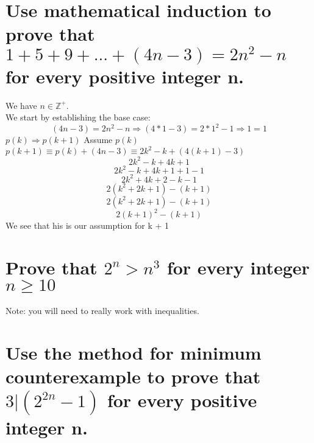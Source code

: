 \section{Use mathematical induction to prove that $1+5+9+...+(4n-3)=2n^2-n$ for every positive integer n.}
We have $n\in \mathbb{Z}^{+}$.\\
We start by establishing the base case:
\begin{equation}
(4n-3) = 2n^2-n \Rightarrow (4*1-3) = 2*1^2-1 \Rightarrow 1 = 1
\end{equation}
$p(k)\Rightarrow p(k+1)$
Assume $p(k)$\\
$p(k+1) \equiv p(k)+(4n-3) \equiv 2k^2-k+(4(k+1)-3)$\\
\begin{equation}
2k^2-k+4k+1
\end{equation}
\begin{equation}
2k^2-k+4k+1+1-1
\end{equation}
\begin{equation}
2k^2+4k+2-k-1
\end{equation}
\begin{equation}
2(k^2+2k+1)-(k+1)
\end{equation}
\begin{equation}
2(k^2+2k+1)-(k+1)
\end{equation}
\begin{equation}
2(k+1)^2-(k+1)
\end{equation}
We see that his is our assumption for k + 1


\section{Prove that $2^n>n^3$ for every integer $n\geq 10$}
Note: you will need to really work with inequalities.


\section{Use the method for minimum counterexample to prove that $3|(2^{2n}-1)$ for every positive integer n.}


